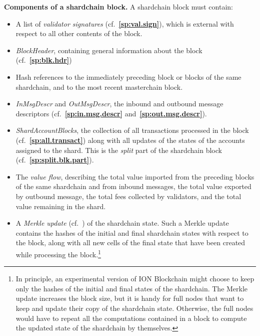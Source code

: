 \documentclass[12pt,oneside]{article}
\def\makepoint#1{\medbreak\noindent{\bf #1.\ }}
\def\nxsubpoint{\refstepcounter{subsubsection}%
  \smallbreak\makepoint{\thesubsubsection}}
\def\refpoint#1{{\rm\textbf{\ref{#1}}}}
\let\ptref=\refpoint
\def\emb#1{\textbf{#1.}}
\begin{document}
\nxsubpoint\label{sp:shard.blk.comp}\emb{Components of a shardchain block}
A shardchain block must contain:
\begin{itemize}
\item A list of {\em validator signatures\/} (cf.~\ptref{sp:val.sign}), which is external with respect to all other contents of the block.
\item {\em BlockHeader}, containing general information about the block (cf.~\ptref{sp:blk.hdr})
\item Hash references to the immediately preceding block or blocks of the same shardchain, and to the most recent masterchain block.
\item {\em InMsgDescr\/} and {\em OutMsgDescr}, the inbound and outbound message descriptors (cf.~\ptref{sp:in.msg.descr} and~\ptref{sp:out.msg.descr}).
\item {\em ShardAccountBlocks}, the collection of all transactions processed in the block (cf.~\ptref{sp:all.transact}) along with all updates of the states of the accounts assigned to the shard. This is the {\em split\/} part of the shardchain block (cf.~\ptref{sp:split.blk.part}).
\item The {\em value flow}, describing the total value imported from the preceding blocks of the same shardchain and from inbound messages, the total value exported by outbound message, the total fees collected by validators, and the total value remaining in the shard.
\item A {\em Merkle update\/} (cf.~\cite[3.1]{TVM}) of the shardchain state. Such a Merkle update contains the hashes of the initial and final shardchain states with respect to the block, along with all new cells of the final state that have been created while processing the block.\footnote{In principle, an experimental version of ION Blockchain might choose to keep only the hashes of the initial and final states of the shardchain. The Merkle update increases the block size, but it is handy for full nodes that want to keep and update their copy of the shardchain state. Otherwise, the full nodes would have to repeat all the computations contained in a block to compute the updated state of the shardchain by themselves.}
\end{itemize}
\end{document}
